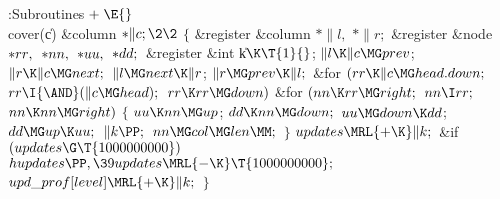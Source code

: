 \Y\B\4:Subroutines\X${}\mathrel+\E{}$\6
\\{cover}(\|c)\1\1\6
\&{column} ${}{*}\|c;\2\2{}$\6
${}\{{}$\5
\1\&{register} \&{column} ${}{*}\|l,{}$ ${}{*}\|r;{}$\6
\&{register} \&{node} ${}{*}\\{rr},{}$ ${}{*}\\{nn},{}$ ${}{*}\\{uu},{}$ ${}{*}%
\\{dd};{}$\6
\&{register} \&{int} \|k${}\K\T{1}{}$;\7
${}\|l\K\|c\MG\\{prev}{}$;\5
${}\|r\K\|c\MG\\{next};{}$\6
${}\|l\MG\\{next}\K\|r{}$;\5
${}\|r\MG\\{prev}\K\|l;{}$\6
\&{for} ${}(\\{rr}\K\|c\MG\\{head}.\\{down};{}$ ${}\\{rr}\I{\AND}(\|c\MG%
\\{head});{}$ ${}\\{rr}\K\\{rr}\MG\\{down}){}$\1\6
\&{for} ${}(\\{nn}\K\\{rr}\MG\\{right};{}$ ${}\\{nn}\I\\{rr};{}$ ${}\\{nn}\K%
\\{nn}\MG\\{right}){}$\5
${}\{{}$\1\6
${}\\{uu}\K\\{nn}\MG\\{up}{}$;\5
${}\\{dd}\K\\{nn}\MG\\{down};{}$\6
${}\\{uu}\MG\\{down}\K\\{dd}{}$;\5
${}\\{dd}\MG\\{up}\K\\{uu};{}$\6
${}\|k\PP;{}$\6
${}\\{nn}\MG\\{col}\MG\\{len}\MM;{}$\6
\4${}\}{}$\2\2\6
${}\\{updates}\MRL{+{\K}}\|k;{}$\6
\&{if} ${}(\\{updates}\G\T{1000000000}){}$\1\5
${}\\{hupdates}\PP,\39\\{updates}\MRL{-{\K}}\T{1000000000};{}$\2\6
${}\\{upd\_prof}[\\{level}]\MRL{+{\K}}\|k;{}$\6
\4${}\}{}$\2\par
\fi

